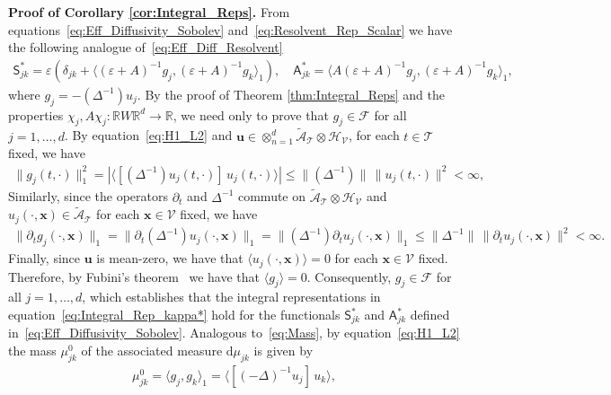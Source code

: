 \documentclass[leqno,onefignum,onetabnum]{siamltex1213}
\renewcommand{\d}{\mathrm{d}}
\newcommand{\Qb}{\mathbf{Q}}
\newcommand{\Tc}{\mathcal{T}}
\newcommand{\Vc}{\mathcal{V}}
\newcommand{\Sm}{\mathsf{S}}
\newcommand{\Am}{\mathsf{A}}
\newcommand{\Hs}{\mathscr{H}}
\newcommand{\As}{\mathscr{A}}
\newcommand{\Fs}{\mathscr{F}}
\newcommand\bnabla{\mbox{\boldmath${\nabla}$}}
\providecommand\bcdot{\boldsymbol{\cdot}}
\newcommand{\vecg}{\boldsymbol{g}}
\newcommand{\vecx}{\boldsymbol{x}}
\newcommand{\vecu}{\boldsymbol{u}}
\begin{document}
\textbf{Proof of Corollary \ref{cor:Integral_Reps}.}\hspace{1ex}
%
From equations~\eqref{eq:Eff_Diffusivity_Sobolev}
and~\eqref{eq:Resolvent_Rep_Scalar} we have the following analogue
of~\eqref{eq:Eff_Diff_Resolvent} 
%
\begin{align}%
 \Sm^*_{jk}=\varepsilon\left(\delta_{jk}+\langle(\varepsilon+A)^{-1}g_j,(\varepsilon+A)^{-1}g_k\rangle_1\right), \quad
 \Am^*_{jk}=\langle A(\varepsilon+A)^{-1}g_j,(\varepsilon+A)^{-1}g_k\rangle_1,
\end{align}
%
where $g_j=-(\Delta^{-1})u_j$. By the proof of Theorem
\ref{thm:Integral_Reps} and the properties
$\chi_j,A\chi_j:\mathbb{R}W\mathbb{R}^d\to\mathbb{R}$, we need only to prove
that $g_j\in\Fs$ for all $j=1,\ldots,d$. By equation~\eqref{eq:H1_L2} and
$\vecu \in\otimes_{n=1}^d\tilde{\As}_{\Tc}\otimes\Hs_{\Vc}$, for each $t\in\Tc$
fixed, we have 
%
\begin{align}
  \|g_j(t,\cdot)\|_1^2%
             =|\langle[(\Delta^{-1})u_j(t,\cdot)]\,u_j(t,\cdot)\rangle|
             \leq\|(\Delta^{-1})\|\,\|u_j(t,\cdot)\|^2<\infty,
\end{align}
%
Similarly, since the operators $\partial_t$ and $\Delta^{-1}$ commute on
$\tilde{\As}_{\Tc}\otimes\Hs_{\Vc}$ and $u_j(\cdot,\vecx)\in\tilde{\As}_{\Tc}$
for each $\vecx\in\Vc$ fixed, we have 
%
\begin{align}
  \|\partial_tg_j(\cdot,\vecx)\|_1=\|\partial_t(\Delta^{-1})u_j(\cdot,\vecx)\|_1
                    =\|(\Delta^{-1})\partial_tu_j(\cdot,\vecx)\|_1
                    \leq\|\Delta^{-1}\|\,\|\partial_tu_j(\cdot,\vecx)\|^2<\infty.
\end{align}
%
Finally, since $\vecu$ is mean-zero, we have that
$\langle u_j(\cdot,\vecx)\rangle=0$ for each $\vecx\in\Vc$ fixed. Therefore, by 
Fubini's theorem~\cite{Folland:99:RealAnalysis} we have that
$\langle g_j\rangle=0$. Consequently, $g_j\in\Fs$ for all $j=1,\ldots,d$, which 
establishes that the integral representations in
equation~\eqref{eq:Integral_Rep_kappa*} hold for the functionals
$\Sm^*_{jk}$ and $\Am^*_{jk}$ defined
in~\eqref{eq:Eff_Diffusivity_Sobolev}. Analogous to~\eqref{eq:Mass},
by equation~\eqref{eq:H1_L2} the mass 
$\mu^0_{jk}$ of the associated measure $\d\mu_{jk}$ is given by  
% 
\begin{align}\label{eq:Mass_Scalar}
  \mu^0_{jk}
        =\langle g_j,g_k\rangle_1
        =\langle[(-\Delta)^{-1}u_j]\,u_k\rangle,   
\end{align}
\end{document}
